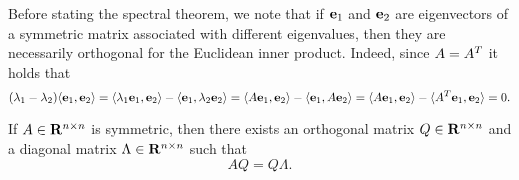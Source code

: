 Before stating the spectral theorem,
we note that if $\mathbf e_1$ and $\mathbf e_2$ are eigenvectors of a symmetric matrix associated with different eigenvalues,
then they are necessarily orthogonal for the Euclidean inner product.
Indeed, since $A = A^T$ it holds that
\[
    (\lambda_1 - \lambda_2) \langle\mathbf e_1, \mathbf e_2\rangle
    = \langle\lambda_1 \mathbf e_1, \mathbf e_2\rangle - \langle\mathbf e_1, \lambda_2 \mathbf e_2\rangle
    = \langle A \mathbf e_1, \mathbf e_2\rangle - \langle\mathbf e_1, A \mathbf e_2\rangle
    = \langle A \mathbf e_1, \mathbf e_2\rangle - \langle A^T \mathbf e_1, \mathbf e_2\rangle = 0.
\]
\begin{theorem}
    If $A \in \mathbf R^{n \times n}$ is symmetric,
    then there exists an orthogonal matrix $Q \in \mathbf R^{n \times n}$ and a diagonal matrix $\Lambda \in \mathbf R^{n \times n}$ such that
    \[
        A Q = Q \Lambda.
    \]
\end{theorem}
